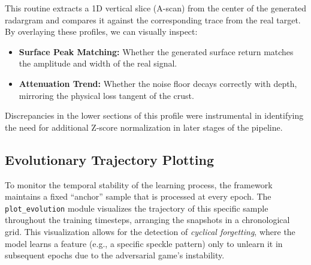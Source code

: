 This routine extracts a 1D vertical slice (A-scan) from the center of the generated radargram and compares it against the corresponding trace from the real target.
By overlaying these profiles, we can visually inspect:
\begin{itemize}
    \item \textbf{Surface Peak Matching:} Whether the generated surface return matches the amplitude and width of the real signal.
    \item \textbf{Attenuation Trend:} Whether the noise floor decays correctly with depth, mirroring the physical loss tangent of the crust. 
\end{itemize}
Discrepancies in the lower sections of this profile were instrumental in identifying the need for additional Z-score normalization in later stages of the pipeline.

\subsection{Evolutionary Trajectory Plotting}
To monitor the temporal stability of the learning process, the framework maintains a fixed \enquote{anchor} sample that is processed at every epoch.
The \texttt{plot\_evolution} module visualizes the trajectory of this specific sample throughout the training timesteps, arranging the snapshots in a chronological grid.
This visualization allows for the detection of \textit{cyclical forgetting}, where the model learns a feature (e.g., a specific speckle pattern) only to unlearn it in subsequent epochs due to the adversarial game's instability.

